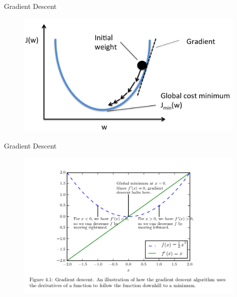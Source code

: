 \documentclass[handout]{beamer}
\begin{document}
\begin{frame}{Gradient Descent}
\begin{figure}[htb]
	\centering
	 \includegraphics[scale=0.15]{pics/sgd.png}
\end{figure}


\end{frame}


\begin{frame}{Gradient Descent}
\begin{figure}[htb]
	\centering
	 \includegraphics[scale=0.45]{pics/gradientdescent.png}
\end{figure}


\end{frame}
\end{document}
